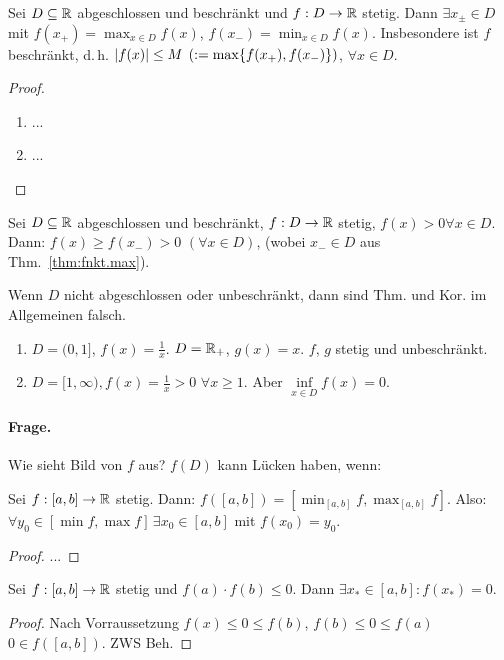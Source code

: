 \documentclass[12pt]{scrreprt}
\begin{document}
\begin{thm}\label{thm:fnkt.max}
Sei $D\subseteq\mathbb{R}$ abgeschlossen und beschränkt und $f: D\rightarrow\mathbb{R}$ stetig. Dann $\exists x_{\pm}\in D$ mit
$f(x_+) = \max_{x\in D} f(x)$, $f(x_-) = \min_{x\in D} f(x)$. Insbesondere ist $f$ beschränkt, d.\,h. 
$\left\lvert f(x)\right\lvert \le M$ $(:= \max\{f(x_+), f(x_-)\})$, $\forall x\in D.$
\end{thm}
\begin{proof}
\begin{enumerate}
\item ... %
\item ...
\end{enumerate}
\end{proof}

\begin{kor}\label{kor:fnkt.max-kor}
Sei $D\subseteq\mathbb{R}$ abgeschlossen und beschränkt, $f: D\rightarrow\mathbb{R}$ stetig, $f(x) > 0 \forall x\in D$.
Dann: $f(x) \ge f(x_-) > 0$ $(\forall x\in D)$, (wobei $x_-\in D$ aus Thm.~\ref{thm:fnkt.max}).
\end{kor}

\begin{bsp*}
Wenn $D$ nicht abgeschlossen oder unbeschränkt, dann sind Thm. und Kor. im Allgemeinen falsch.
\begin{enumerate}
\item $D=(0, 1]$, $f(x) = \frac{1}{x}$. $D=\mathbb{R}_+$, $g(x) = x$. \folgt $f$, $g$ stetig und unbeschränkt.
\item $D = [1, \infty), f(x) = \frac{1}{x} > 0$ $\forall x\ge 1$. Aber $\inf\limits_{x\in D} f(x) = 0$.
\end{enumerate}
\end{bsp*}

\paragraph{Frage.} Wie sieht Bild von $f$ aus? $f(D)$ kann Lücken haben, wenn:

\begin{thm}\label{thm:fnkt.zws}
Sei $f: [a, b] \rightarrow \mathbb{R}$ stetig. Dann: $f([a, b]) = \left[\min_{[a, b]} f, \max_{[a, b]} f\right]$.
Also: $\forall y_0 \in [\min f, \max f]\,\exists x_0\in [a, b]$ mit $f(x_0) = y_0$.
\end{thm}
\begin{proof}
...
\end{proof}

\begin{kor}[Nullstellensatz]\label{kor:fnkt.nst}
Sei $f:[a,b]\rightarrow\mathbb{R}$ stetig und $f(a)\cdot f(b) \le 0$. Dann $\exists x_*\in [a, b]: f(x_*) = 0$. 
\end{kor}
\begin{proof}
Nach Vorraussetzung $f(x) \le 0 \le f(b)$, $f(b) \le 0 \le f(a)$ \folgt $0\in f([a, b])$. ZWS \folgt Beh.
\end{proof}
\end{document}
